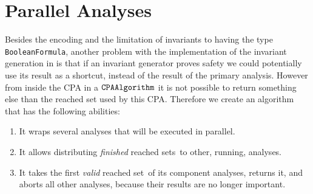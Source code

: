 \section{Parallel Analyses}
Besides the encoding and the limitation of invariants to having the type \texttt{BooleanFormula}, another problem with the implementation of the invariant generation in \CPAchecker{} is that
if an invariant generator proves safety we could potentially use its result as a shortcut, instead of the result of the primary analysis. However from inside the \ac{CPA} in a 
$\mathtt{CPAAlgorithm}{}$ it is not possible to return something else than the reached set used by this \ac{CPA}. Therefore we create an algorithm that has the following abilities:

\begin{enumerate}
 \item It wraps several analyses that will be executed in parallel.
 \item It allows distributing \emph{finished} reached sets\, to other, running, analyses.
 \item It takes the first \emph{valid} reached set\, of its component analyses, returns it, and aborts all other analyses, because their results are no longer important.
\end{enumerate}

